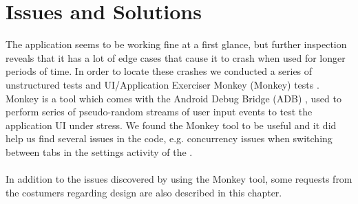 
\chapter{Issues and Solutions}
\label{sec:sprintone_issues_solutions}
The \launcher application seems to be working fine at a first glance, but further inspection reveals that it has a lot of edge cases that cause it to crash when used for longer periods of time. In order to locate these crashes we conducted a series of unstructured tests and UI/Application Exerciser Monkey (Monkey) tests \parencite{android_monkey}. Monkey is a tool which comes with the Android Debug Bridge (ADB) \parencite{android_adb}, used to perform series of pseudo-random streams of user input events to test the application UI under stress. We found the Monkey tool to be useful and it did help us find several issues in the code, e.g. concurrency issues when switching between tabs in the settings activity of the \launcher.
\\\\
In addition to the issues discovered by using the Monkey tool, some requests from the costumers regarding design are also described in this chapter.





















